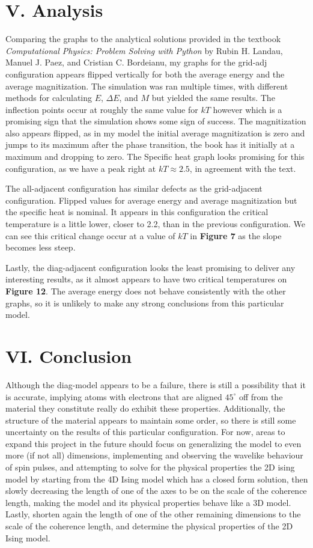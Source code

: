 \documentclass{article}
\begin{document}
\section*{V. Analysis}
\indent \indent Comparing the graphs to the analytical solutions provided in the
textbook \textit{Computational Physics: Problem Solving with Python} by Rubin H.
Landau, Manuel J. Paez, and Cristian C. Bordeianu, my graphs for the grid-adj 
configuration appears flipped vertically for both the average energy and the 
average magnitization. The simulation was ran multiple times, with different 
methods for calculating $E$, $\Delta E$, and $M$ but yielded the same results.
The inflection points occur at roughly the same value for $kT$ however which is 
a promising sign that the simulation shows some sign of success. The magnitization
also appears flipped, as in my model the initial average magnitization is zero
and jumps to its maximum after the phase transition, the book has it initially
at a maximum and dropping to zero. The Specific heat graph looks promising for 
this configuration, as we have a peak right at $kT \approx 2.5$, in agreement
with the text.

\indent The all-adjacent configuration has similar defects as the grid-adjacent
configuration. Flipped values for average energy and average magnitization but
the specific heat is nominal. It appears in this configuration the critical
temperature is a little lower, closer to 2.2, than in the previous configuration.
We can see this critical change occur at a value of $kT$ in \textbf{Figure 7}
as the slope becomes less steep.

\indent Lastly, the diag-adjacent configuration looks the least promising to
deliver any interesting results, as it almost appears to have two critical 
temperatures on \textbf{Figure 12}. The average energy does not behave 
consistently with the other graphs, so it is unlikely to make any strong 
conclusions from this particular model.
\section*{VI. Conclusion}
\indent \indent Although the diag-model appears to be a failure, there is still
a possibility that it is accurate, implying atoms with electrons that are aligned
$45^\circ$ off from the material they constitute really do exhibit these properties.
Additionally, the structure of the material appears to maintain some order, so there
is still some uncertainty on the results of this particular configuration. For now,
areas to expand this project in the future should focus on generalizing the model
to even more (if not all) dimensions, implementing and observing the wavelike 
behaviour of spin pulses, and attempting to solve for the physical properties
the 2D ising model by starting from the 4D Ising model which has a closed form 
solution, then slowly decreasing the length of one of the axes to be on the scale
of the coherence length, making the model and its physical properties behave like
a 3D model. Lastly, shorten again the length of one of the other remaining dimensions
to the scale of the coherence length, and determine the physical properties of the
2D Ising model.
\end{document}
